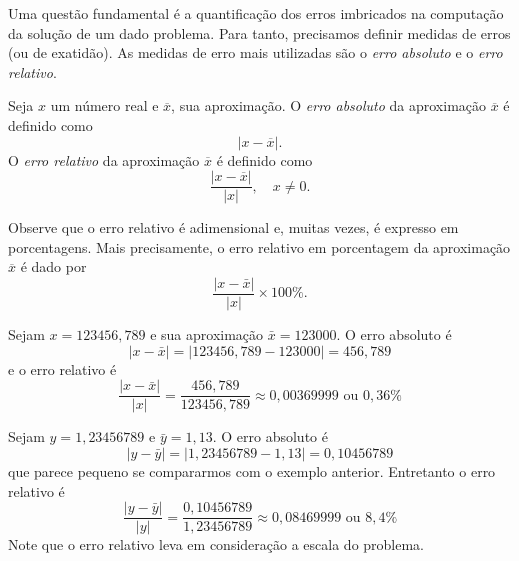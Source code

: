 Uma questão fundamental é a quantificação dos erros imbricados na computação da solução de um dado problema. Para tanto, precisamos definir medidas de erros (ou de exatidão). As medidas de erro mais utilizadas são o \emph{erro absoluto} e o \emph{erro relativo}.

\begin{defn} Seja $x$ um número real e $\overline{x}$, sua aproximação. O \emph{erro absoluto} da aproximação $\overline{x}$ é definido como
  \begin{equation}
    |x-\overline{x}|.
  \end{equation}
O \emph{erro relativo} da aproximação $\overline{x}$ é definido como
\begin{equation}
\frac{|x-\overline{x}|}{|x|},\quad x\neq 0.
\end{equation}
\end{defn}

\begin{obs}
  Observe que o erro relativo é adimensional e, muitas vezes, é expresso em porcentagens. Mais precisamente, o erro relativo em porcentagem da aproximação $\overline{x}$ é dado por
  \begin{equation}
    \frac{|x-\bar{x}|}{|x|}\times 100 \%.
  \end{equation}
\end{obs}

\begin{ex}
Sejam $x=123456,789$ e sua aproximação $\bar{x}=123000$. O erro absoluto é
\begin{equation}
|x-\bar{x}|=|123456,789-123000|=456,789
\end{equation}
e o erro relativo é
\begin{equation}
\frac{|x-\bar{x}|}{|x|}=\frac{456,789}{123456,789}\approx 0,00369999 \text{ ou }0,36\%
\end{equation}
\end{ex}

\begin{ex}
Sejam $y=1,23456789$ e $\bar{y}=1,13$. O erro absoluto é
\begin{equation}
|y-\bar{y}|=|1,23456789-1,13|=0,10456789
\end{equation}
que parece pequeno se compararmos com o exemplo anterior. Entretanto o erro relativo é
\begin{equation}
\frac{|y-\bar{y}|}{|y|}=\frac{0,10456789}{1,23456789}\approx 0,08469999 \text{ ou }8,4\%
\end{equation}
Note que o erro relativo leva em consideração a escala do problema.
\end{ex}



